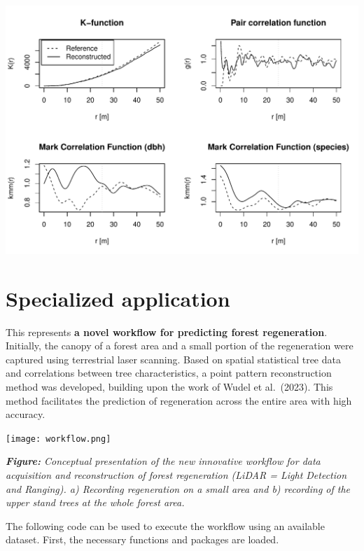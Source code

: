 \documentclass[
  letterpaper,
  DIV=11,
  numbers=noendperiod]{scrreprt}
\begin{document}
\includegraphics{further_application_examples_files/figure-pdf/unnamed-chunk-5-1.pdf}


\chapter{Specialized application}\label{specialized-application}

This represents \textbf{a novel workflow for predicting forest
regeneration}. Initially, the canopy of a forest area and a small
portion of the regeneration were captured using terrestrial laser
scanning. Based on spatial statistical tree data and correlations
between tree characteristics, a point pattern reconstruction method was
developed, building upon the work of Wudel et al.~(2023). This method
facilitates the prediction of regeneration across the entire area with
high accuracy.

\texttt{[image: workflow.png]}

\emph{\textbf{Figure:} Conceptual presentation of the new innovative
workflow for data acquisition and reconstruction of forest regeneration
(LiDAR = Light Detection and Ranging). a) Recording regeneration on a
small area and b) recording of the upper stand trees at the whole forest
area.}

The following code can be used to execute the workflow using an
available dataset. First, the necessary functions and packages are
loaded.
\end{document}
